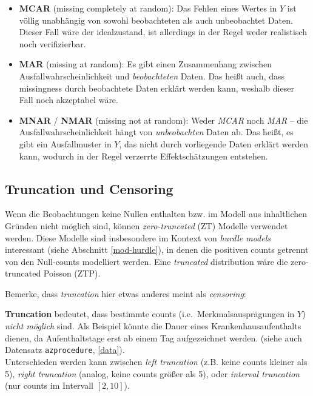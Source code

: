 \documentclass[ngerman,a4paper,]{scrartcl}
\providecommand{\tightlist}{%
  \setlength{\itemsep}{0pt}\setlength{\parskip}{0pt}}
\theoremstyle{definition}
\theoremstyle{definition}
\theoremstyle{definition}
\theoremstyle{remark}
\begin{document}
\begin{itemize}
\tightlist
\item
  \textbf{MCAR} (missing completely at random): Das Fehlen eines Wertes in \(Y\) ist völlig unabhängig von sowohl beobachteten als auch unbeobachtet Daten. Dieser Fall wäre der idealzustand, ist allerdings in der Regel weder realistisch noch verifizierbar.
\item
  \textbf{MAR} (missing at random): Es gibt einen Zusammenhang zwischen Ausfallwahrscheinlichkeit und \emph{beobachteten} Daten. Das heißt auch, dass missingness durch beobachtete Daten erklärt werden kann, weshalb dieser Fall noch akzeptabel wäre.
\item
  \textbf{MNAR} / \textbf{NMAR} (missing not at random): Weder \emph{MCAR} noch \emph{MAR} -- die Ausfallwahrscheinlichkeit hängt von \emph{unbeobachten} Daten ab. Das heißt, es gibt ein Ausfallmuster in \(Y\), das nicht durch vorliegende Daten erklärt werden kann, wodurch in der Regel verzerrte Effektschätzungen entstehen.
\end{itemize}

\hypertarget{trunc-cens}{%
\subsection{Truncation und Censoring}\label{trunc-cens}}

Wenn die Beobachtungen keine Nullen enthalten bzw. im Modell aus inhaltlichen Gründen nicht möglich sind, können \emph{zero-truncated} (ZT) Modelle verwendet werden. Diese Modelle sind insbesondere im Kontext von \emph{hurdle models} interessant (siehe Abschnitt \ref{mod-hurdle}), in denen die positiven counts getrennt von den Null-counts modelliert werden. Eine \emph{truncated} distribution wäre die zero-truncated Poisson (ZTP).

Bemerke, dass \emph{truncation} hier etwas anderes meint als \emph{censoring}:

\textbf{Truncation} bedeutet, dass bestimmte counts (i.e.~Merkmalsausprägungen in \(Y\)) \emph{nicht möglich} sind. Als Beispiel könnte die Dauer eines Krankenhausaufenthalts dienen, da Aufenthaltstage erst ab einem Tag aufgezeichnet werden. (siehe auch Datensatz \texttt{azprocedure}, \ref{data}).\\
Unterschieden werden kann zwischen \emph{left truncation} (z.B. keine counts kleiner als 5), \emph{right truncation} (analog, keine counts größer als 5), oder \emph{interval truncation} (nur counts im Intervall \([2, 10]\)).
\end{document}
